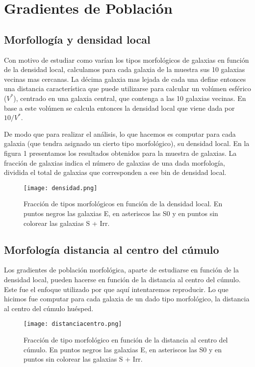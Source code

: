 \documentclass[a4paper,10pt]{article}
\begin{document}
\section{Gradientes de Poblaci\'on}
\subsection{Morfollog\'ia y densidad local}

Con motivo de estudiar como var\'ian los tipos morfol\'ogicos de galaxias en funci\'on de la densidad local, calculamos para cada galaxia de la muestra sus 10 galaxias vecinas mas cercanas. La d\'ecima galaxia mas lejada de cada una define entonces una distancia caracter\'istica que puede utilizarse para calcular un vol\'umen esf\'erico ($V^{\ast}$), centrado en una galaxia central, que contenga a las 10 galaxias vecinas. En base a este vol\'umen se calcula entonces la densidad local que viene dada por $10/V^{\ast}$. 

De modo que para realizar el an\'alisis, lo que hacemos es computar para cada galaxia (que tendra asignado un cierto tipo morfol\'ogico), su densidad local. En la figura 1 presentamos los resultados obtenidos para la muestra de galaxias. La fracci\'on de galaxias indica el n\'umero de galaxias de una dada morfolog\'ia, dividida el total de galaxias que corresponden a ese bin de densidad local. 

\begin{figure}[h]
 \centering
 \texttt{[image: densidad.png]}
 \caption{Fracci\'on de tipos morfol\'ogicos en funci\'on de la densidad local. En puntos negros las galaxias E, en asteriscos las S0 y en puntos sin colorear las galaxias S + Irr. }
 \label{fig:1}
\end{figure}

\subsection{Morfolog\'ia distancia al centro del c\'umulo}

Los gradientes de poblaci\'on morfol\'ogica, aparte de estudiarse en funci\'on de la densidad local, pueden hacerse en funci\'on de la distancia al centro del c\'umulo. Este fue el enfoque utilizado por \citet{Whitmore1993} que aqu\'i intentaremos reproducir. Lo que hicimos fue computar para cada galaxia de un dado tipo morfol\'ogico, la distancia al centro del c\'umulo hu\'esped. 
\begin{figure}[h]
 \centering
 \texttt{[image: distanciacentro.png]}
 \caption{Fracci\'on de tipo morfol\'ogico en funci\'on de la distancia al centro del c\'umulo. En puntos negros las galaxias E, en asteriscos las S0 y en puntos sin colorear las galaxias S + Irr.}
 \label{fig: 2}
\end{figure}
\end{document}
